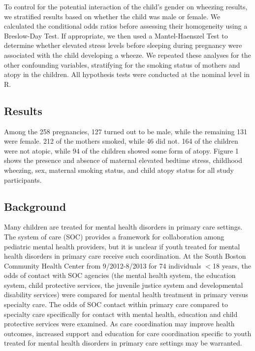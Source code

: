 \documentclass{article}
\begin{document}
\begin{enumerate}
	To control for the potential interaction of the child’s gender on wheezing results, we stratified results based on whether the child was male or female. We calculated the conditional odds ratios before assessing their homogeneity using a Breslow-Day Test. If appropriate, we then used a Mantel-Haenszel Test to determine whether elevated stress levels before sleeping during pregnancy were associated with the child developing a wheeze. We repeated these analyses for the other confounding variables, stratifying for the smoking status of mothers and atopy in the children. All hypothesis tests were conducted at the nominal level in R.

	\subsection*{Results}
	Among the 258 pregnancies, 127 turned out to be male, while the remaining 131 were female. 212 of the mothers smoked, while 46 did not. 164 of the children were not atopic, while 94 of the children showed some form of atopy. Figure 1 shows the presence and absence of maternal elevated bedtime stress, childhood wheezing, sex, maternal smoking status, and child atopy status for all study participants. 




	\newpage
	\subsection*{Background}

	Many children are treated for mental health disorders in primary care settings.  The system of care (SOC) provides a framework for collaboration among pediatric mental health providers, but it is unclear if youth treated for mental health disorders in primary care receive such coordination.  At the South Boston Community Health Center from 9/2012-8/2013 for 74 individuals $<$18 years, the odds of contact with SOC agencies (the mental health system, the education system, child protective services, the juvenile justice system and developmental disability services) were compared for mental health treatment in primary versus specialty care.  The odds of SOC contact within primary care compared to specialty care specifically for contact with mental health, education and child protective services were examined.  As care coordination may improve health outcomes, increased support and education for care coordination specific to youth treated for mental health disorders in primary care settings may be warranted.
	

\end{enumerate}
\end{document}
